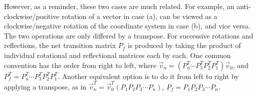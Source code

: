 \par
However, as a reminder, these two cases are much related. For example, an anti-clockwise/positive rotation of a vector in case (a), can be viewed as a clockwise/negative rotation of the coordinate system in case (b), and vice versa. The two operations are only differed by a transpose. For successive rotations and reflections, the net transition matrix $P_f$ is produced by taking the product of individual rotational and reflectional matrices each by each. One common convention has the order from right to left, where $\vec{v}_n = (P_n^T\cdots P_3^TP_2^TP_1^T)\vec{v}_0$, and $P_f^T = P_n^T\cdots P_3^TP_2^TP_1^T$. Another equivalent option is to do it from left to right by applying a transpose, as in
$\vec{v}_n^T = \vec{v}_0^T(P_1P_2P_3\cdots P_n)$, $P_f = P_1P_2P_3\cdots P_n$.

